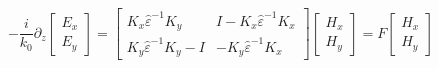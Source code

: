 \documentclass[a4paper,10pt]{report}
\begin{document}
\begin{equation} \label{eq:def_F}
-\frac{i}{k_0} \partial_z \left[ \begin{array}{c} E_x \\ E_y \end{array} \right] =
\left[ \begin{array}{cc} K_x \hat{\varepsilon}^{-1} K_y & I - K_x \hat{\varepsilon}^{-1} K_x \\ K_y \hat{\varepsilon}^{-1} K_y - I & -K_y \hat{\varepsilon}^{-1} K_x \end{array} \right]
\left[ \begin{array}{c} H_x \\ H_y \end{array} \right] =
F \left[ \begin{array}{c} H_x \\ H_y \end{array} \right]
\end{equation}
\end{document}
